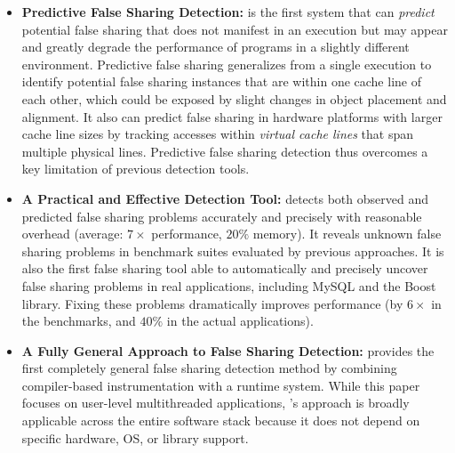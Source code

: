 \begin{itemize}


\item
\textbf{Predictive False Sharing Detection:} \Predator{} is the first system that can \emph{predict} potential false sharing that does
not manifest in an execution but may appear and greatly degrade the
performance of programs in a slightly different
environment. Predictive false sharing generalizes from a single
execution to identify potential false sharing instances that are
within one cache line of each other, which could be exposed by slight
changes in object placement and alignment. It also can predict false sharing
in hardware platforms with larger cache line sizes by tracking
accesses within \emph{virtual cache lines} that span multiple physical
lines. Predictive false sharing detection thus overcomes a key
limitation of previous detection tools.



\item
\textbf{A Practical and Effective Detection Tool:} \Predator{} detects both observed and predicted false sharing 
problems accurately and precisely with reasonable overhead (average:
$7\times$ performance, $20\%$ memory).  It reveals unknown false
sharing problems in benchmark suites evaluated by previous approaches. It
is also the first false sharing tool able to automatically and precisely uncover
false sharing problems in real applications, including 
MySQL and the Boost library. Fixing these problems 
dramatically improves performance (by $6\times$ in the benchmarks, and $40\%$ in the actual applications).


\item
\textbf{A Fully General Approach to False Sharing Detection:} \Predator{} provides the first completely general false sharing detection method by
combining compiler-based instrumentation with a runtime system. While this
paper focuses on user-level multithreaded applications, \Predator{}'s
approach is broadly applicable across the entire software stack
because it does not depend on specific hardware, OS, or library
support.


\end{itemize}
